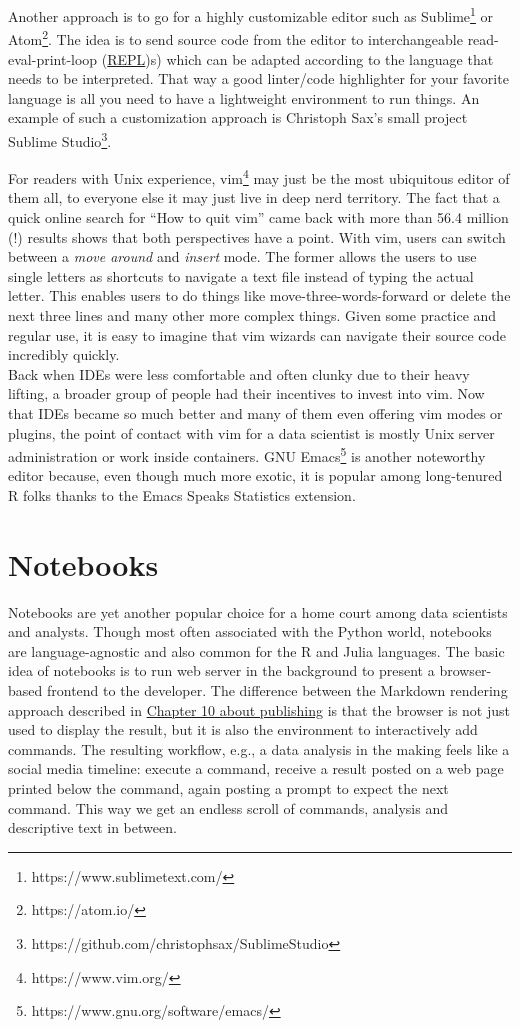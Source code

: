 \documentclass[
  12pt,
  letterpaper,
]{krantz}
\begin{document}
Another approach is to go for a highly customizable editor such as
Sublime\footnote{https://www.sublimetext.com/} or Atom\footnote{https://atom.io/}.
The idea is to send source code from the editor to interchangeable
read-eval-print-loop (\protect\hyperlink{glossary}{REPL})s) which can be
adapted according to the language that needs to be interpreted. That way
a good linter/code highlighter for your favorite language is all you
need to have a lightweight environment to run things. An example of such
a customization approach is Christoph Sax's small project Sublime
Studio\footnote{https://github.com/christophsax/SublimeStudio}.

For readers with Unix experience, vim\footnote{https://www.vim.org/} may
just be the most ubiquitous editor of them all, to everyone else it may
just live in deep nerd territory. The fact that a quick online search
for ``How to quit vim'' came back with more than 56.4 million (!)
results shows that both perspectives have a point. With vim, users can
switch between a \emph{move around} and \emph{insert} mode. The former
allows the users to use single letters as shortcuts to navigate a text
file instead of typing the actual letter. This enables users to do
things like move-three-words-forward or delete the next three lines and
many other more complex things. Given some practice and regular use, it
is easy to imagine that vim wizards can navigate their source code
incredibly quickly.\\
Back when IDEs were less comfortable and often clunky due to their heavy
lifting, a broader group of people had their incentives to invest into
vim. Now that IDEs became so much better and many of them even offering
vim modes or plugins, the point of contact with vim for a data scientist
is mostly Unix server administration or work inside
containers. GNU Emacs\footnote{https://www.gnu.org/software/emacs/}
is another noteworthy editor because, even though much more exotic, it
is popular among long-tenured R folks thanks to the Emacs Speaks
Statistics extension.

\hypertarget{notebooks}{%
\section{Notebooks}\label{notebooks}}

Notebooks are yet another popular choice for a home court among data
scientists and analysts. Though most often associated with the Python
world, notebooks are language-agnostic and also common
for the R and Julia languages. The basic idea of notebooks is to run web
server in the background to present a browser-based frontend to the
developer. The difference between the Markdown rendering approach
described in \href{publishing.html}{Chapter 10 about publishing} is that
the browser is not just used to display the result, but it is also the
environment to interactively add commands. The resulting workflow, e.g.,
a data analysis in the making feels like a social media timeline:
execute a command, receive a result posted on a web page printed below
the command, again posting a prompt to expect the next command. This way
we get an endless scroll of commands, analysis and descriptive text in
between.
\end{document}
